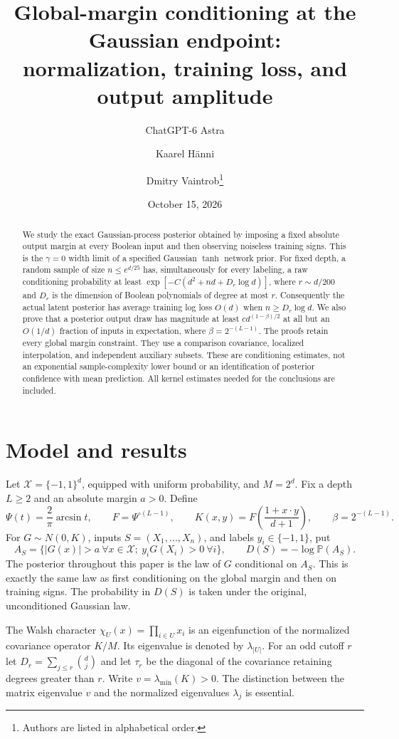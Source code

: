 \documentclass[11pt]{article}
\title{Global-margin conditioning at the Gaussian endpoint:\\normalization, training loss, and output amplitude}
\author{ChatGPT-6 Astra \and Kaarel H\"anni \and Dmitry Vaintrob\thanks{Authors are listed in alphabetical order.}}
\date{October 15, 2026}
\theoremstyle{remark}\newtheorem{remark}[theorem]{Remark}
\newcommand{\Pp}{\mathbb P}
\begin{document}
\maketitle
\begin{abstract}
We study the exact Gaussian-process posterior obtained by imposing a fixed absolute output margin at every Boolean input and then observing noiseless training signs. This is the $\gamma=0$ width limit of a specified Gaussian $\tanh$ network prior. For fixed depth, a random sample of size $n\le e^{d/25}$ has, simultaneously for every labeling, a raw conditioning probability at least $\exp[-C(d^2+nd+D_r\log d)]$, where $r\sim d/200$ and $D_r$ is the dimension of Boolean polynomials of degree at most $r$. Consequently the actual latent posterior has average training log loss $O(d)$ when $n\ge D_r\log d$. We also prove that a posterior output draw has magnitude at least $c d^{(1-\beta)/2}$ at all but an $O(1/d)$ fraction of inputs in expectation, where $\beta=2^{-(L-1)}$. The proofs retain every global margin constraint. They use a comparison covariance, localized interpolation, and independent auxiliary subsets. These are conditioning estimates, not an exponential sample-complexity lower bound or an identification of posterior confidence with mean prediction. All kernel estimates needed for the conclusions are included.
\end{abstract}

\section{Model and results}
Let $\mathcal X=\{-1,1\}^d$, equipped with uniform probability, and $M=2^d$. Fix a depth $L\ge2$ and an absolute margin $a>0$. Define
\[
 \Psi(t)=\frac2\pi\arcsin t,\qquad F=\Psi^{\circ(L-1)},\qquad
 K(x,y)=F\!\left(\frac{1+x\cdot y}{d+1}\right),\qquad
 \beta=2^{-(L-1)}.
\]
For $G\sim N(0,K)$, inputs $S=(X_1,\ldots,X_n)$, and labels $y_i\in\{-1,1\}$, put
\[
 A_S=\{|G(x)|>a\ \forall x\in\mathcal X;\ y_iG(X_i)>0\ \forall i\},
 \qquad D(S)=-\log\Pp(A_S).
\]
The posterior throughout this paper is the law of $G$ conditional on $A_S$. This is exactly the same law as first conditioning on the global margin and then on training signs. The probability in $D(S)$ is taken under the original, unconditioned Gaussian law.

The Walsh character $\chi_U(x)=\prod_{i\in U}x_i$ is an eigenfunction of the normalized covariance operator $K/M$. Its eigenvalue is denoted by $\lambda_{|U|}$. For an odd cutoff $r$ let $D_r=\sum_{j\le r}\binom dj$ and let $\tau_r$ be the diagonal of the covariance retaining degrees greater than $r$. Write $v=\lambda_{\min}(K)>0$. The distinction between the matrix eigenvalue $v$ and the normalized eigenvalues $\lambda_j$ is essential.
\end{document}
